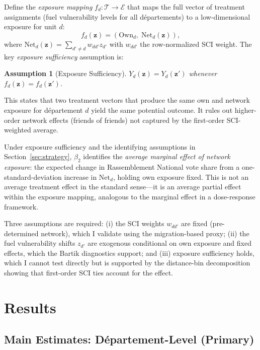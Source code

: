 \documentclass[12pt]{article}
\newtheorem{assumption}{Assumption}
\newcommand{\rn}{Rassemblement National}
\newcommand{\dept}{d\'{e}partement}
\newcommand{\depts}{d\'{e}partements}
\begin{document}
Define the \emph{exposure mapping} $f_d: \mathcal{T} \to \mathcal{E}$ that maps the full vector of treatment assignments (fuel vulnerability levels for all \depts{}) to a low-dimensional exposure for unit $d$:
\begin{equation}
f_d(\mathbf{z}) = \left(\text{Own}_d, \; \text{Net}_d(\mathbf{z})\right),
\label{eq:exposure_mapping}
\end{equation}
where $\text{Net}_d(\mathbf{z}) = \sum_{d' \neq d} w_{dd'} z_{d'}$ with $w_{dd'}$ the row-normalized SCI weight. The key \emph{exposure sufficiency} assumption is:
\begin{assumption}[Exposure Sufficiency]
$Y_d(\mathbf{z}) = Y_d(\mathbf{z}')$ whenever $f_d(\mathbf{z}) = f_d(\mathbf{z}')$.
\end{assumption}
This states that two treatment vectors that produce the same own and network exposure for \dept{} $d$ yield the same potential outcome. It rules out higher-order network effects (friends of friends) not captured by the first-order SCI-weighted average.

Under exposure sufficiency and the identifying assumptions in Section~\ref{sec:strategy}, $\beta_2$ identifies the \emph{average marginal effect of network exposure}: the expected change in \rn{} vote share from a one-standard-deviation increase in $\text{Net}_d$, holding own exposure fixed. This is not an average treatment effect in the standard sense---it is an average partial effect within the exposure mapping, analogous to the marginal effect in a dose-response framework.

Three assumptions are required: (i) the SCI weights $w_{dd'}$ are fixed (pre-determined network), which I validate using the migration-based proxy; (ii) the fuel vulnerability shifts $z_{d'}$ are exogenous conditional on own exposure and fixed effects, which the Bartik diagnostics support; and (iii) exposure sufficiency holds, which I cannot test directly but is supported by the distance-bin decomposition showing that first-order SCI ties account for the effect.



\section{Results}
\label{sec:results}

\subsection{Main Estimates: D\'{e}partement-Level (Primary)}
\end{document}
